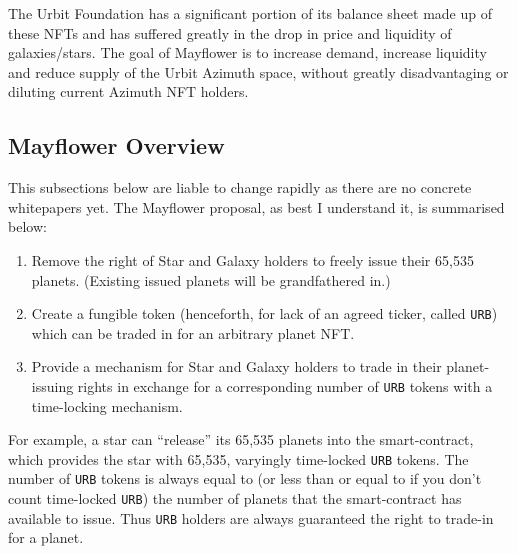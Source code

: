 \documentclass{article}
\begin{document}
	The Urbit Foundation has a significant portion of its balance sheet made up of these NFTs and has suffered greatly in the drop in price and liquidity of galaxies/stars. The goal of Mayflower is to increase demand, increase liquidity and reduce supply of the Urbit Azimuth space, without greatly disadvantaging or diluting current Azimuth NFT holders.
		
	\subsection{Mayflower Overview}
	This subsections below are liable to change rapidly as there are no concrete whitepapers yet. The Mayflower proposal, as best I understand it, is summarised below:
	\begin{enumerate}
		\item Remove the right of Star and Galaxy holders to freely issue their 65,535 planets. (Existing issued planets will be grandfathered in.)
		\item Create a fungible token (henceforth, for lack of an agreed ticker, called \texttt{URB}) which can be traded in for an arbitrary planet NFT.
		\item Provide a mechanism for Star and Galaxy holders to trade in their planet-issuing rights in exchange for a corresponding number of \texttt{URB} tokens with a time-locking mechanism.
	\end{enumerate}
	For example, a star can ``release'' its 65,535 planets into the smart-contract, which provides the star with 65,535, varyingly time-locked \texttt{URB} tokens. The number of \texttt{URB} tokens is always equal to (or less than or equal to if you don't count time-locked \texttt{URB}) the number of planets that the smart-contract has available to issue. Thus \texttt{URB} holders are always guaranteed the right to trade-in for a planet.
		
\end{document}

